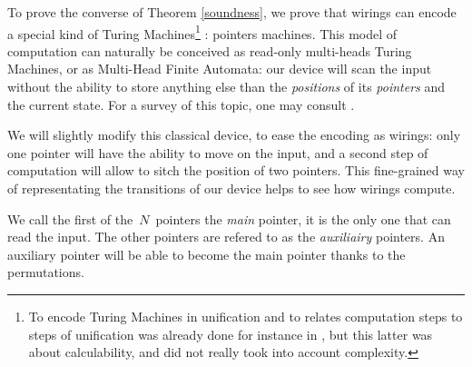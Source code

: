 To prove the converse of Theorem \ref{soundness}, we prove that wirings can encode a special kind of Turing Machines\footnote{%
To encode Turing Machines in unification and to relates computation steps to steps of unification was already done for instance in \cite{Itai1987}, but this latter was about calculability, and did not really took into account complexity.}%
: pointers machines.
This model of computation can naturally be conceived as read-only multi-heads Turing Machines, or as Multi-Head Finite Automata: our device will scan the input without the ability to store anything else than the \emph{positions} of its \emph{pointers} and the current state.
For a survey of this topic, one may consult \cite[Chap.4]{Aubert2013b}.

We will slightly modify this classical device, to ease the encoding as wirings: only one pointer will have the ability to move on the input, and a second step of computation will allow to sitch the position of two pointers.
This fine-grained way of representating the transitions of our device helps to see how wirings compute.


We call the first of the $\,N\,$ pointers the \emph{main} pointer, it is the only one that can read the input.
The other pointers are refered to as the \emph{auxiliairy} pointers.
An auxiliary pointer will be able to become the main pointer thanks to the permutations.

